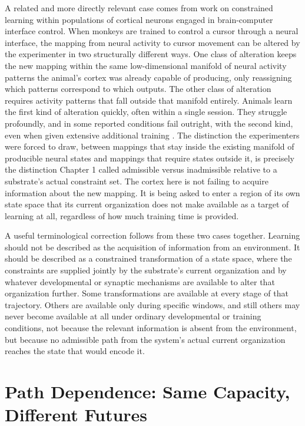 \documentclass[11pt]{book}
\begin{document}
A related and more directly relevant case comes from work on constrained learning within populations of cortical neurons engaged in brain-computer interface control. When monkeys are trained to control a cursor through a neural interface, the mapping from neural activity to cursor movement can be altered by the experimenter in two structurally different ways. One class of alteration keeps the new mapping within the same low-dimensional manifold of neural activity patterns the animal's cortex was already capable of producing, only reassigning which patterns correspond to which outputs. The other class of alteration requires activity patterns that fall outside that manifold entirely. Animals learn the first kind of alteration quickly, often within a single session. They struggle profoundly, and in some reported conditions fail outright, with the second kind, even when given extensive additional training \cite{sadtler2014}. The distinction the experimenters were forced to draw, between mappings that stay inside the existing manifold of producible neural states and mappings that require states outside it, is precisely the distinction Chapter 1 called admissible versus inadmissible relative to a substrate's actual constraint set. The cortex here is not failing to acquire information about the new mapping. It is being asked to enter a region of its own state space that its current organization does not make available as a target of learning at all, regardless of how much training time is provided.

A useful terminological correction follows from these two cases together. Learning should not be described as the acquisition of information from an environment. It should be described as a constrained transformation of a state space, where the constraints are supplied jointly by the substrate's current organization and by whatever developmental or synaptic mechanisms are available to alter that organization further. Some transformations are available at every stage of that trajectory. Others are available only during specific windows, and still others may never become available at all under ordinary developmental or training conditions, not because the relevant information is absent from the environment, but because no admissible path from the system's actual current organization reaches the state that would encode it.

\section{Path Dependence: Same Capacity, Different Futures}
\end{document}
